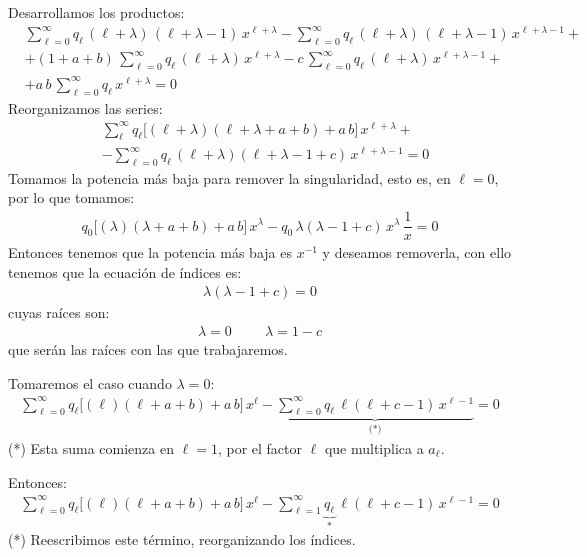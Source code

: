 Desarrollamos los productos:
\begin{align*}
&\sum_{\ell=0}^{\infty} q_{\ell} \, (\ell + \lambda) \, (\ell + \lambda - 1) \, x^{\ell+\lambda} - \sum_{\ell=0}^{\infty} q_{\ell} \, (\ell + \lambda) \, (\ell + \lambda - 1) \, x^{\ell+\lambda-1} + \\[0.5em]
&+ (1 + a + b) \, \sum_{\ell=0}^{\infty} q_{\ell} \, (\ell + \lambda) \, x^{\ell+\lambda} - c \, \sum_{\ell=0}^{\infty} q_{\ell} \, (\ell + \lambda) \, x^{\ell+\lambda-1} + \\[0.5em]
&+ a \, b \, \sum_{\ell=0}^{\infty} q_{\ell} \, x^{\ell + \lambda} = 0
\end{align*}
Reorganizamos las series:
\begin{align*}
&\sum_{\ell}^{\infty} q_{\ell} \big[ (\ell + \lambda) (\ell + \lambda + a + b) + a \, b \big] \, x^{\ell + \lambda} + \\[0.5cm]
&- \sum_{\ell=0}^{\infty} q_{\ell} \, (\ell + \lambda) (\ell + \lambda - 1 + c) \, x^{\ell+\lambda-1} = 0
\end{align*}
Tomamos la potencia más baja para remover la singularidad, esto es, en $\ell = 0$, por lo que tomamos:
\begin{align*}
q_{0} \big[ (\lambda) (\lambda + a + b) + a \, b \big] \, x^{\lambda} - q_{0} \, \lambda (\lambda - 1 + c) \, x^{\lambda} \, \dfrac{1}{x} = 0
\end{align*}
Entonces tenemos que la potencia más baja es $x^{-1}$ y deseamos removerla, con ello tenemos que la ecuación de índices es:
\begin{align*}
\lambda (\lambda - 1 + c) = 0
\end{align*}
cuyas raíces son:
\begin{align*}
\lambda = 0 \hspace{1cm} \lambda = 1 - c
\end{align*}
que serán las raíces con las que trabajaremos.
\par
Tomaremos el caso cuando $\lambda = 0$:
\begin{align*}
\sum_{\ell=0}^{\infty} q_{\ell} \big[ (\ell) (\ell + a + b) + a \, b \big] \, x^{\ell} - \underbrace{\sum_{\ell=0}^{\infty} q_{\ell} \, \ell (\ell + c - 1) \, x^{\ell-1}}_{\text{(*)}} = 0
\end{align*}
(*) Esta suma comienza en $\ell = 1$, por el factor $\ell$ que multiplica a $a_{\ell}$.

Entonces:
\begin{align*}
\sum_{\ell=0}^{\infty} q_{\ell} \big[ (\ell) (\ell + a + b) + a \, b \big] \, x^{\ell} - \sum_{\ell=1}^{\infty} \underbrace{q_{\ell}}_{\text{*}} \, \ell (\ell + c - 1) \, x^{\ell-1} = 0
\end{align*}
(*) Reescribimos este término, reorganizando los índices.

